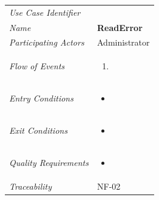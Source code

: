 \documentclass[12pt,letterpaper]{article}
\begin{document}
\begin{center}
	\begin{tabu} to 
		\toprule
		Use Case Identifier & \readerror{} \\
		Name & {\bf ReadError} \\
		Participating Actors & Administrator \\
		Flow of Events & 
	    \begin{enumerate}[topsep=-1em,leftmargin=*]
		    \item 
		\end{enumerate} \\

		Entry Conditions &
		\begin{itemize}[topsep=-1em,leftmargin=*]
		    \item 
        \end{itemize} \\

		Exit Conditions &
		\begin{itemize}[topsep=-1em,leftmargin=*]
		    \item 
        \end{itemize} \\

		Quality Requirements &
		\begin{itemize}[topsep=-1em,leftmargin=*]
		    \item 
        \end{itemize} \\

		Traceability & NF-02 \\
		\toprule
	\end{tabu}
\end{center}
\end{document}
